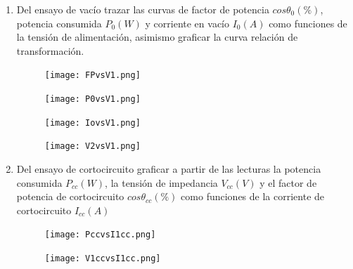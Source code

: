\begin{enumerate}
    \item Del ensayo de vacío trazar las curvas de factor de potencia $cos\theta_{0}(\%)$, potencia consumida $P_{0}(W)$ y corriente en vacío $I_{0}(A)$ como funciones de la tensión de alimentación, asimismo graficar la curva relación de transformación.
    \begin{figure}[H]
    \centering
        \begin{minipage}{.5\textwidth}
          \centering
          \texttt{[image: FPvsV1.png]}
          \captionsetup{labelformat=empty}
        \end{minipage}%
        \begin{minipage}{.5\textwidth}
          \centering
          \texttt{[image: P0vsV1.png]}
          \captionsetup{labelformat=empty}
        \end{minipage}
    \end{figure}
    
    \begin{figure}[H]
    \centering
        \begin{minipage}{.5\textwidth}
          \centering
          \texttt{[image: IovsV1.png]}
          \captionsetup{labelformat=empty}
        \end{minipage}%
        \begin{minipage}{.5\textwidth}
          \centering
          \texttt{[image: V2vsV1.png]}
          \captionsetup{labelformat=empty}
        \end{minipage}
    \end{figure}
    
    \item Del ensayo de cortocircuito graficar a partir de las lecturas la potencia consumida $P_{cc}(W)$, la tensión de impedancia $V_{cc}(V)$ y el factor de potencia de cortocircuito $cos\theta_{cc}(\%)$ como funciones de la corriente de cortocircuito $I_{cc}(A)$
    \begin{figure}[H]
    \centering
        \begin{minipage}{.5\textwidth}
          \centering
          \texttt{[image: PccvsI1cc.png]}
          \captionsetup{labelformat=empty}
        \end{minipage}%
        \begin{minipage}{.5\textwidth}
          \centering
          \texttt{[image: V1ccvsI1cc.png]}
          \captionsetup{labelformat=empty}
        \end{minipage}
    \end{figure}
    

\end{enumerate}
